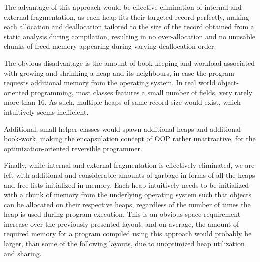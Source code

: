The advantage of this approach would be effective elimination of internal and external fragmentation, as each heap fits their targeted record perfectly, making each allocation and deallocation tailored to the size of the record obtained from a static analysis during compilation, resulting in no over-allocation and no unusable chunks of freed memory appearing during varying deallocation order.

The obvious disadvantage is the amount of book-keeping and workload associated with growing and shrinking a heap and its neighbours, in case the program requests additional memory from the operating system. In real world object-oriented programming, most classes features a small number of fields, very rarely more than 16. As such, multiple heaps of same record size would exist, which intuitively seems inefficient. 

Additional, small helper classes would spawn additional heaps and additional book-work, making the encapsulation concept of OOP rather unattractive, for the optimization-oriented reversible programmer. 

Finally, while internal and external fragmentation is effectively eliminated, we are left with additional and considerable amounts of garbage in forms of all the heaps and free lists initialized in memory. Each heap intuitively needs to be initialized with a chunk of memory from the underlying operating system such that objects can be allocated on their respective heaps, regardless of the number of times the heap is used during program execution. This is an obvious space requirement increase over the previously presented layout, and on average, the amount of required memory for a program compiled using this approach would probably be larger, than some of the following layouts, due to unoptimized heap utilization and sharing.




